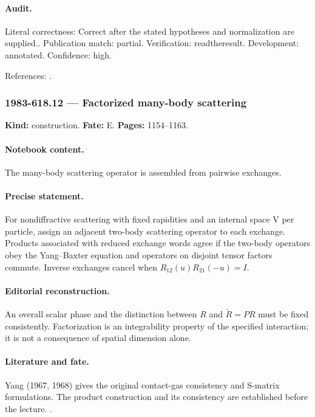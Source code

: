 \paragraph{Audit.} Literal correctness: Correct after the stated hypotheses and normalization are supplied.. Publication match: partial. Verification: readtheresult. Development: annotated. Confidence: high.

\noindent References: \citep{yang1968smatrix,sklyaninfaddeev1978quantum}.\par

\subsubsection{1983-618.12 --- Factorized many-body scattering}

\label{item:1983-618.12}

\noindent\textbf{Kind:} construction. \textbf{Fate:} E. \textbf{Pages:} 1154--1163.\par

\paragraph{Notebook content.} The many-body scattering operator is assembled from pairwise exchanges.

\paragraph{Precise statement.} For nondiffractive scattering with fixed rapidities and an internal space V per particle, assign an adjacent two-body scattering operator to each exchange. Products associated with reduced exchange words agree if the two-body operators obey the Yang--Baxter equation and operators on disjoint tensor factors commute. Inverse exchanges cancel when $R_{12}(u)R_{21}(-u)=I$.

\paragraph{Editorial reconstruction.} An overall scalar phase and the distinction between $R$ and $\check R=PR$ must be fixed consistently. Factorization is an integrability property of the specified interaction; it is not a consequence of spatial dimension alone.

\paragraph{Literature and fate.} Yang (1967, 1968) gives the original contact-gas consistency and S-matrix formulations. The product construction and its consistency are established before the lecture. \citep{yang1967manybody,yang1968smatrix}.

